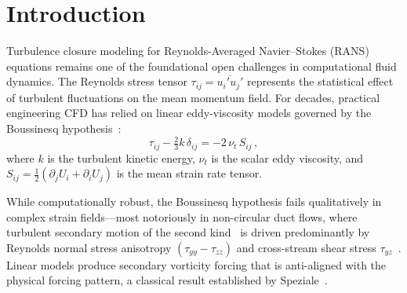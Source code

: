 \documentclass[preprint,aps,prb,longbibliography,superscriptaddress]{revtex4-2}
\begin{document}
\begin{abstract}
In this convex setting, direct warm-starting accelerates convergence (reaching tolerance in $59$ steps vs.\ $101$ for cold start), but incurs a higher peak violation ($2.00\%$ vs.\ $1.22\%$). Staged warm-starting (Path~A) is both slower ($123$ total steps) and accumulates higher deployed violation ($5.90\%$), directly inheriting the intermediate scaffold's boundary excursion. Un-staged cold start is therefore optimal for realizability preservation, while direct warm-starting minimizes step count. We formalize this configuration space as a \emph{Stratified Design Atlas} and delineate the necessary conditions---non-convex losses, coupled Navier--Stokes evaluation, and non-nested basis edits---under which geometric transport and path-dependence become non-trivial.
\end{abstract}

\maketitle

\section{Introduction}\label{sec:intro}

Turbulence closure modeling for Reynolds-Averaged Navier--Stokes (RANS)
equations remains one of the foundational open challenges in computational
fluid dynamics. The Reynolds stress tensor
$\tau_{ij} = \overline{u_i' u_j'}$ represents the statistical effect of
turbulent fluctuations on the mean momentum field. For decades, practical
engineering CFD has relied on linear eddy-viscosity models governed by the
Boussinesq hypothesis~\cite{Boussinesq1877}:
\begin{equation}\label{eq:boussinesq}
  \tau_{ij} - \tfrac{2}{3}k\,\delta_{ij} = -2\,\nu_t\, S_{ij}\,,
\end{equation}
where $k$ is the turbulent kinetic energy, $\nu_t$ is the scalar eddy
viscosity, and $S_{ij} = \tfrac{1}{2}(\partial_j U_i + \partial_i U_j)$ is
the mean strain rate tensor.

While computationally robust, the Boussinesq hypothesis fails qualitatively in
complex strain fields---most notoriously in non-circular duct flows, where
turbulent secondary motion of the second kind~\cite{Prandtl1926} is driven
predominantly by Reynolds normal stress anisotropy
$(\tau_{yy} - \tau_{zz})$ and cross-stream shear stress
$\tau_{yz}$~\cite{Speziale1987}. Linear models produce secondary vorticity
forcing that is anti-aligned with the physical forcing pattern, a classical
result established by Speziale~\cite{Speziale1987}.
\end{document}
